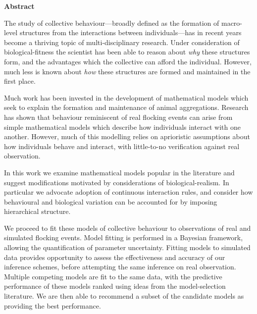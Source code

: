 \thispagestyle{empty}

\clearpage

\vspace*{\fill}

\begin{center}
  \textbf{Abstract}\\[0.75cm]

  \begin{minipage}{0.9\textwidth}
    \setlength{\parskip}{0.45em}

    The study of collective behaviour---broadly defined as the formation of
    macro-level structures from the interactions between individuals---has in
    recent years become a thriving topic of multi-disciplinary research. Under
    consideration of biological-fitness the scientist has been able to reason
    about \emph{why} these structures form, and the advantages which the
    collective can afford the individual. However, much less is known about
    \emph{how} these structures are formed and maintained in the first place.

    Much work has been invested in the development of mathematical models which
    seek to explain the formation and maintenance of animal aggregations.
    Research has shown that behaviour reminiscent of real flocking events can
    arise from simple mathematical models which describe how individuals
    interact with one another. However, much of this modelling relies on
    aprioristic assumptions about how individuals behave and interact, with
    little-to-no verification against real observation.

    In this work we examine mathematical models popular in the literature and
    suggest modifications motivated by considerations of biological-realism. In
    particular we advocate adoption of continuous interaction rules, and
    consider how behavioural and biological variation can be accounted for by
    imposing hierarchical structure.

    We proceed to fit these models of collective behaviour to observations of
    real and simulated flocking events. Model fitting is performed in a
    Bayesian framework, allowing the quantification of parameter uncertainty.
    Fitting models to simulated data provides opportunity to assess the
    effectiveness and accuracy of our inference schemes, before attempting the
    same inference on real observation. Multiple competing models are fit to
    the same data, with the predictive performance of these models ranked using
    ideas from the model-selection literature. We are then able to recommend a
    subset of the candidate models as providing the best performance.


\end{minipage}
\end{center}
